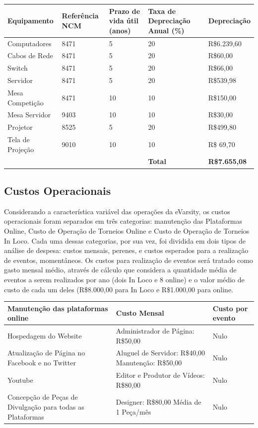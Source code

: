 \documentclass[a4paper, 12pt]{paper}
\begin{document}
\begin{table}[ht]
	\centering
	\begin{tabular}{p{3.5cm}p{2cm}p{3cm}p{3.5cm}p{2.5cm}}
		\hline
		\cellcolor{gray}Equipamento&\cellcolor{gray}Referência NCM&\cellcolor{gray}Prazo de vida útil (anos)&\cellcolor{gray}Taxa de Depreciação Anual (\%)&\cellcolor{gray}Depreciação \\
		\hline
		Computadores&8471&5&20&R\$6.239,60\\
		Cabos de Rede&8471&5&20&R\$60,00\\
		Switch&8471&5&20&R\$66,00\\
		Servidor&8471&5&20&R\$539,98\\
		Mesa Competição&8471&10&10&R\$150,00\\
		Mesa Servidor&9403&10&10&R\$30,00\\
		Projetor&8525&5&20&R\$499,80\\
		Tela de Projeção&9010&10&10&R\$ 69,70\\
		\hline
		&&&\textbf{Total}&\textbf{R\$7.655,08}\\
		\hline
	\end{tabular}
\end{table}
\subsection{Custos Operacionais}
Considerando a característica variável das operações da eVarsity, os custos operacionais foram separados em três categorias: manutenção das Plataformas Online, Custo de Operação de Torneios Online e Custo de Operação de Torneios In Loco. Cada uma dessas categorias, por sua vez, foi dividida em dois tipos de análise de despesa: custos mensais, perenes, e custos esperados para a realização de eventos, momentâneos. Os custos para realização de eventos será tratado como gasto mensal médio, através de cálculo que considera a quantidade média de eventos a serem realizados por ano (dois In  Loco e 8 online) e o valor médio de custo de cada um deles (R\$8.000,00 para In Loco e R\$1.000,00 para online.

\begin{table}[ht]
	\centering
	\begin{tabular}{p{6cm}p{7cm}p{2cm}}
		\hline
		\cellcolor{gray}Manutenção das plataformas online&\cellcolor{gray}Custo Mensal&\cellcolor{gray}Custo por evento\\
		\hline
		Hospedagem do Website&Administrador de Página: R\$50,00&Nulo\\
		Atualização de Página no Facebook e no Twitter&Aluguel de Servidor: R\$40,00
		Manutenção: R\$50,00&Nulo\\
		Youtube&Editor e Produtor de Vídeos: R\$80,00&Nulo\\
		Concepção de Peças de Divulgação para todas as Plataformas&Designer: R\$80,00
		Média de 1 Peça/mês&Nulo\\
		\hline
	\end{tabular}
\end{table}
\end{document}
